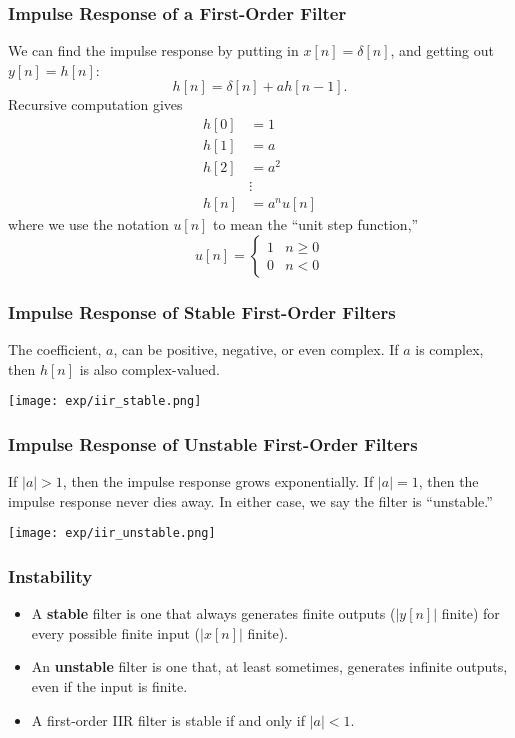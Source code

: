 \documentclass{beamer}
\begin{document}
\begin{frame}
  \frametitle{Impulse Response of a First-Order Filter}

  We can find the impulse response by putting in $x[n]=\delta[n]$, and
  getting out $y[n]=h[n]$:
  \[
  h[n] = \delta[n] + ah[n-1].
  \]
  Recursive computation gives
  \begin{align*}
    h[0] &= 1 \\
    h[1] &= a\\
    h[2] &= a^2\\
     & \vdots\\
    h[n] &= a^nu[n]
  \end{align*}
  where we use the notation $u[n]$ to mean the ``unit step function,''
  \[u[n] = \begin{cases}1& n\ge 0\\0 & n<0\end{cases}\]
\end{frame}

\begin{frame}
  \frametitle{Impulse Response of Stable First-Order Filters}

  The coefficient, $a$, can be positive, negative, or even complex.
  If $a$ is complex, then $h[n]$ is also complex-valued.
  \centerline{\texttt{[image: exp/iir\_stable.png]}}

\end{frame}

\begin{frame}
  \frametitle{Impulse Response of Unstable First-Order Filters}

  If $|a|>1$, then the impulse response grows exponentially.  If
  $|a|=1$, then the impulse response never dies away.  In either case,
  we say the filter is ``unstable.''
  \centerline{\texttt{[image: exp/iir\_unstable.png]}}

\end{frame}

\begin{frame}
  \frametitle{Instability}

  \begin{itemize}
  \item A {\bf stable} filter is one that always generates finite
    outputs ($|y[n]|$ finite) for every possible finite input
    ($|x[n]|$ finite).
  \item An {\bf unstable} filter is one that, at least sometimes,
    generates infinite outputs, even if the input is finite.
  \item A first-order IIR filter is stable if and only if $|a|<1$.
  \end{itemize}
\end{frame}
\end{document}
